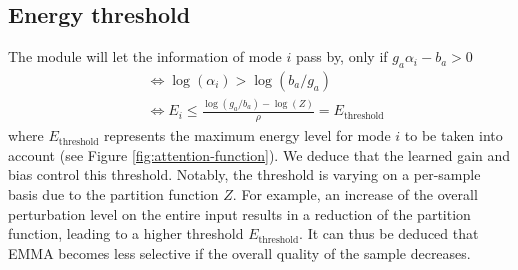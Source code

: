 \subsection*{Energy threshold}
The module will let the information of mode $i$ pass by, only if $g_a\alpha_i - b_a > 0$
\begin{equation}
\begin{split}
&\Leftrightarrow\log(\alpha_i) > \log(b_a/g_a)\\
&\Leftrightarrow E_i \leq \frac{\log(g_a/b_a) - \log(Z)}{\rho} = E_{\text{threshold}}
\end{split}
\end{equation}
where $E_{\text{threshold}}$ represents the maximum energy level for mode $i$ to be taken into account (see Figure \ref{fig:attention-function}). We deduce that the learned gain and bias control this threshold. Notably, the threshold is varying on a per-sample basis due to the partition function $Z$. For example, an increase of the overall perturbation level on the entire input results in a reduction of the partition function, leading to a higher threshold $E_{\text{threshold}}$. It can thus be deduced that EMMA becomes less selective if the overall quality of the sample decreases. 

